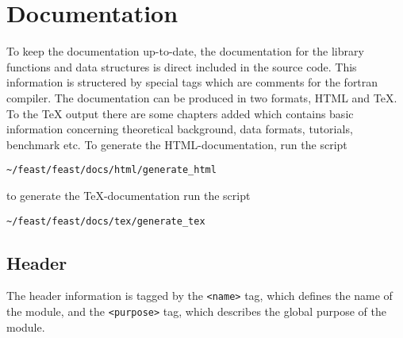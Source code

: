 \section{Documentation}

To keep the documentation up-to-date, the documentation for the
library functions and data structures is direct included in the source
code. This information is structered by special tags which are comments
for the fortran compiler. The documentation can be produced in two
formats, HTML and TeX. To the TeX output there are some chapters added
which contains basic information concerning theoretical background, data
formats, tutorials, benchmark etc. To generate the HTML-documentation,
run the script

\verb+~/feast/feast/docs/html/generate_html+

to generate the TeX-documentation run the script

\verb+~/feast/feast/docs/tex/generate_tex+


\subsection{Header}

The header information is tagged by the \verb+<name>+ tag, which defines
the name of the module, and the \verb+<purpose>+ tag, which describes the
global purpose of the module.

